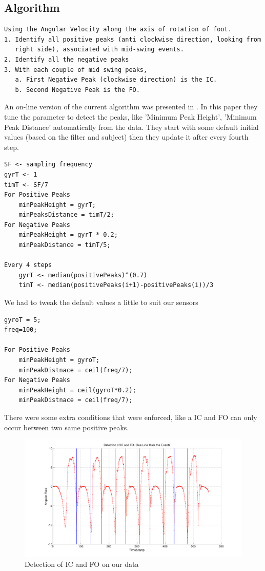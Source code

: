 \documentclass[12pt]{article}
\begin{document}
\FloatBarrier 

\subsection*{Algorithm}

\begin{verbatim}
Using the Angular Velocity along the axis of rotation of foot.
1. Identify all positive peaks (anti clockwise direction, looking from
   right side), associated with mid-swing events.
2. Identify all the negative peaks
3. With each couple of mid swing peaks,
   a. First Negative Peak (clockwise direction) is the IC.
   b. Second Negative Peak is the FO.

\end{verbatim}

An on-line version of the current algorithm was presented in \cite{7173053}. In this paper they tune the parameter to detect the peaks, like 'Minimum Peak Height', 'Minimum Peak Distance' automatically from the data. They start with some default initial values (based on the filter and subject) then they update it after every fourth step.

\begin{verbatim}
SF <- sampling frequency
gyrT <- 1
timT <- SF/7
For Positive Peaks
    minPeakHeight = gyrT;
    minPeaksDistance = timT/2;
For Negative Peaks
    minPeakHeight = gyrT * 0.2;
    minPeakDistance = timT/5;
    
Every 4 steps
    gyrT <- median(positivePeaks)^(0.7)
    timT <- median(positivePeaks(i+1)-positivePeaks(i))/3
\end{verbatim}

We had to tweak the default values a little to suit our sensors
\begin{verbatim}
gyroT = 5;
freq=100;

For Positive Peaks
    minPeakHeight = gyroT;
    minPeakDistnace = ceil(freq/7);
For Negative Peaks
    minPeakHeight = ceil(gyroT*0.2);
    minPeakDistnace = ceil(freq/7);
\end{verbatim}

There were some extra conditions that were enforced, like a IC and FO can only occur between two same positive peaks.
\begin{figure}[!htb]
\centering
\includegraphics[scale=.3]{ourictodetection.png}
\caption{Detection of IC and FO on our data \\
}
\label{ouricnadtodetection}
\end{figure}
\FloatBarrier
\end{document}
